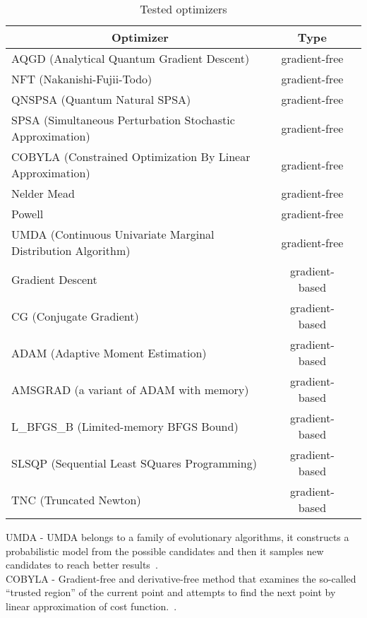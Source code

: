 \begin{table}[H]
    \centering
    \caption{Tested optimizers}
    \begin{tabular}{|l|c|c|} 
        \hline
        \multicolumn{1}{|c|}{\textbf{Optimizer}} & \textbf{Type}\\
        \hline
        AQGD (Analytical Quantum Gradient Descent) & gradient-free \\ 
        \hline
        NFT (Nakanishi-Fujii-Todo) & gradient-free \\ 
        \hline
        QNSPSA (Quantum Natural SPSA) & gradient-free \\ 
        \hline
        SPSA (Simultaneous Perturbation Stochastic Approximation) & gradient-free \\ 
        \hline
        COBYLA (Constrained Optimization By Linear Approximation) & gradient-free \\ 
        \hline
        Nelder Mead & gradient-free \\ 
        \hline
        Powell & gradient-free \\ 
        \hline
        UMDA (Continuous Univariate Marginal Distribution Algorithm) & gradient-free \\ 
        \hline
        Gradient Descent & gradient-based \\ 
        \hline
        CG (Conjugate Gradient) & gradient-based \\ 
        \hline
        ADAM (Adaptive Moment Estimation) & gradient-based \\ 
        \hline
        AMSGRAD (a variant of ADAM with memory) & gradient-based \\ 
        \hline
        L\_BFGS\_B (Limited-memory BFGS Bound) & gradient-based \\ 
        \hline
        SLSQP (Sequential Least SQuares Programming) & gradient-based \\ 
        \hline
        TNC (Truncated Newton) & gradient-based \\ 
        \hline
    \end{tabular}
    \label{tab:optimizers}
\end{table}
UMDA - UMDA belongs to a family of evolutionary algorithms, it constructs a probabilistic model from the possible candidates and then it samples new candidates to reach better results~\cite{umda}.\\
COBYLA - Gradient-free and derivative-free method that examines the so-called ``trusted region'' of the current point and attempts to find the next point by linear approximation of cost function.~\cite{cobyla}.\\
